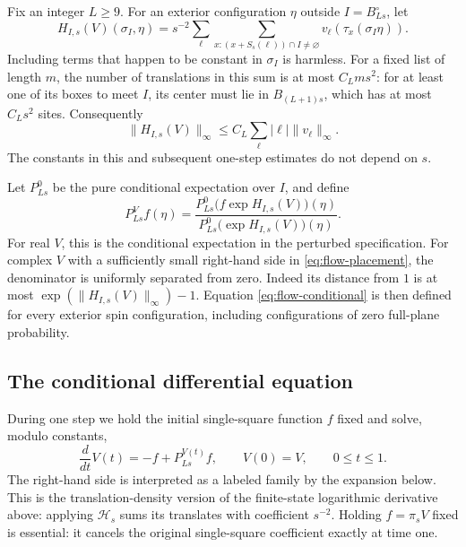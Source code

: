 Fix an integer \(L\ge9\).  For an exterior configuration \(\eta\) outside
\(I=B_{Ls}^\circ\), let
\begin{equation}\label{eq:flow-local-hamiltonian}
 H_{I,s}(V)(\sigma_I,\eta)
 =s^{-2}\sum_\ell\sum_{x:(x+S_s(\ell))\cap I\ne\varnothing}
 v_\ell(\tau_x(\sigma_I\eta)).
\end{equation}
Including terms that happen to be constant in \(\sigma_I\) is harmless.
For a fixed list of length \(m\), the number of translations in this sum
is at most \(C_Lms^2\): for at least one of its boxes to meet \(I\), its
center must lie in \(B_{(L+1)s}\), which has at most \(C_Ls^2\) sites.
Consequently
\begin{equation}\label{eq:flow-placement}
 \|H_{I,s}(V)\|_\infty
 \le C_L\sum_\ell |\ell|\|v_\ell\|_\infty.
\end{equation}
The constants in this and subsequent one-step estimates do not depend on
\(s\).

Let \(P^0_{Ls}\) be the pure conditional expectation over \(I\), and define
\begin{equation}\label{eq:flow-conditional}
 P^V_{Ls}f(\eta)=
 \frac{P^0_{Ls}\bigl(f\exp H_{I,s}(V)\bigr)(\eta)}
 {P^0_{Ls}\bigl(\exp H_{I,s}(V)\bigr)(\eta)}.
\end{equation}
For real \(V\), this is the conditional expectation in the perturbed
specification.  For complex \(V\) with a sufficiently small right-hand
side in \eqref{eq:flow-placement}, the denominator is uniformly separated
from zero.  Indeed its distance from \(1\) is at most
\(\exp(\|H_{I,s}(V)\|_\infty)-1\).  Equation
\eqref{eq:flow-conditional} is then defined for every exterior spin
configuration, including configurations of zero full-plane probability.

\subsection{The conditional differential equation}

During one step we hold the initial single-square function \(f\) fixed and
solve, modulo constants,
\begin{equation}\label{eq:flow-ode}
 \frac{d}{dt}V(t)=-f+P^{V(t)}_{Ls}f,
 \qquad V(0)=V,\qquad 0\le t\le1.
\end{equation}
The right-hand side is interpreted as a labeled family by the expansion
below.  This is the translation-density version of the finite-state
logarithmic derivative above: applying \(\mathcal H_s\) sums its translates
with coefficient \(s^{-2}\).  Holding \(f=\pi_sV\) fixed is essential:
it cancels the original single-square coefficient exactly at time one.

